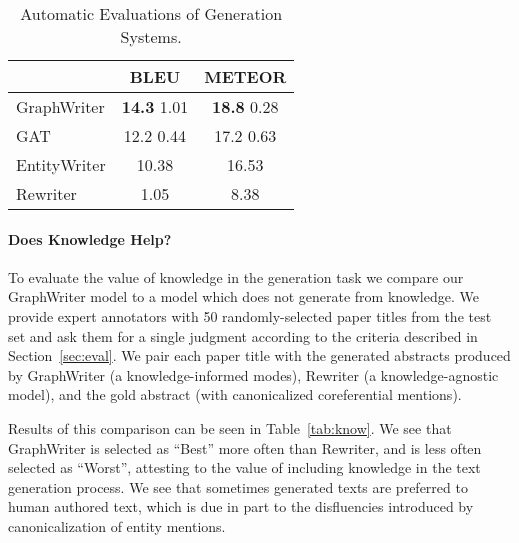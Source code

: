 \documentclass[11pt,a4paper]{article}
\begin{document}
\begin{table}\begin{small}
\begin{center}
\begin{tabular}{lcc}
     & BLEU & METEOR \\ \hline
    GraphWriter  & {\bf 14.3}  1.01 & {\bf 18.8}  0.28  \\
    GAT & 12.2  0.44 & 17.2  0.63  \\
    EntityWriter & 10.38 & 16.53 \\ 
    Rewriter & 1.05 & 8.38 \\ \hline
\end{tabular}
\caption{Automatic Evaluations of Generation Systems.}
\label{tab:compare}
\end{center}\end{small}
\end{table}


\paragraph{Does Knowledge Help?}
To evaluate the value of knowledge in the generation task we compare our GraphWriter model to a model which does not generate from knowledge.  
We provide expert annotators with 50 randomly-selected paper titles from the test set and ask them for a single judgment according to the criteria described in Section~\ref{sec:eval}. 
We pair each paper title with the generated abstracts produced by GraphWriter (a knowledge-informed modes), Rewriter (a knowledge-agnostic model), and the gold abstract (with canonicalized coreferential mentions).

Results of this comparison can be seen in Table~\ref{tab:know}. 
We see that GraphWriter is selected as ``Best'' more often than Rewriter, and is less often selected as ``Worst'', attesting to the value of including knowledge in the text generation process.
We see that sometimes generated texts are preferred to human authored text, which is due in part to the disfluencies introduced by canonicalization of entity mentions. 
\end{document}
